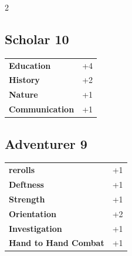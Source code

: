 \begin{multicols}{2}
\begin{tcolorbox}

\end{tcolorbox}

\begin{tcolorbox}
    \subsection*{Scholar \hfill \small{10 }}
    \tcblower




\begin{tabular}{@{}ll@{}}
    \textbf{Education} & +4\\
    \textbf{History} & +2\\
    \textbf{Nature} & +1\\
    \textbf{Communication} & +1\\
\end{tabular}


\end{tcolorbox}

\begin{tcolorbox}
    \subsection*{Adventurer \hfill \small{9 }}
    \tcblower




\begin{tabular}{@{}ll@{}}
    \textbf{rerolls} & +1\\
    \textbf{Deftness} & +1\\
    \textbf{Strength} & +1\\
    \textbf{Orientation} & +2\\
    \textbf{Investigation} & +1\\
    \textbf{Hand to Hand Combat} & +1\\
\end{tabular}



\end{tcolorbox}
\end{multicols}
